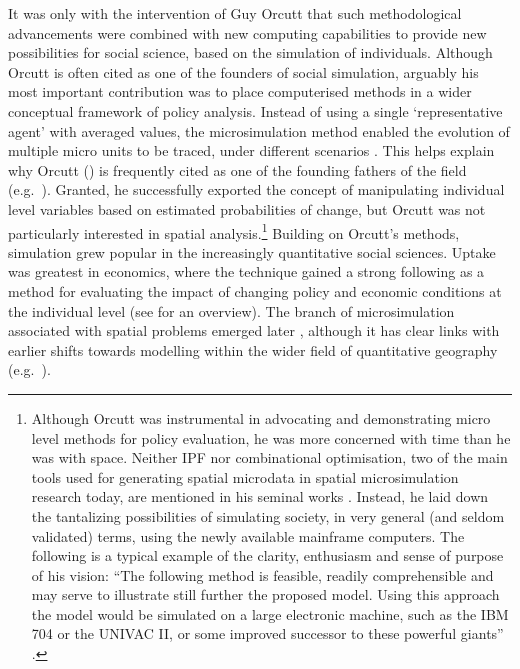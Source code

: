 It was only with the intervention of Guy Orcutt that such methodological
advancements were combined with new computing capabilities to provide new
possibilities for social science, based on the simulation of individuals.
Although Orcutt is often cited as one of the founders of social simulation,
arguably his most important contribution was to place computerised methods in a
wider conceptual framework of policy analysis. Instead of using a
single `representative agent' with averaged values, the microsimulation method
enabled the evolution of multiple micro units to be traced, under different
scenarios \citep[p.~176]{mitton2000microsimulation}.
This helps explain why Orcutt (\citeyear{Orcutt1957-new-type,
orcutt1961microanalysis}) is frequently cited as one of the founding fathers of
the field
(e.g.~\citealp{Clarke+Longley1989-UK-housing-sim,Wu2008,
Ballas2013-4policy-analysis}). Granted, he successfully exported the concept of
manipulating individual level variables based on estimated
probabilities of change, but Orcutt was not particularly interested in
spatial analysis.\footnote{Although
Orcutt was instrumental in advocating and demonstrating
micro level methods for policy evaluation, he was more concerned with time than
he was with
space. %
Neither IPF nor combinational optimisation, two of the main tools used for
generating spatial microdata in spatial microsimulation research today,
are mentioned in his seminal works
\citep{Orcutt1957-new-type,orcutt1961microanalysis}.
Instead, he laid down the tantalizing possibilities of simulating society, in
very general (and seldom validated) terms, using the newly available
mainframe computers. The following is a typical example of the clarity,
enthusiasm and sense of purpose of his vision: ``The following method is
feasible, readily comprehensible and may serve to illustrate still further the
proposed model. Using this approach the model would be simulated on a large
electronic machine, such as the IBM 704 or the UNIVAC II, or some improved
successor to these powerful giants'' \citep[p.~119]{Orcutt1957-new-type}.
}
Building on Orcutt's methods, simulation grew popular in the
increasingly quantitative social sciences. Uptake was
greatest in economics, where the technique
gained a strong following as a method for evaluating the impact of
changing policy and economic conditions at the individual level
(see \citealp{Merz1994} for an overview).
The branch of microsimulation associated with spatial problems emerged later
\citep{Tanton2013-intro}, although it has clear links with earlier shifts
towards modelling within the wider field of quantitative geography
(e.g.~\citealp{Clarke1985}).

